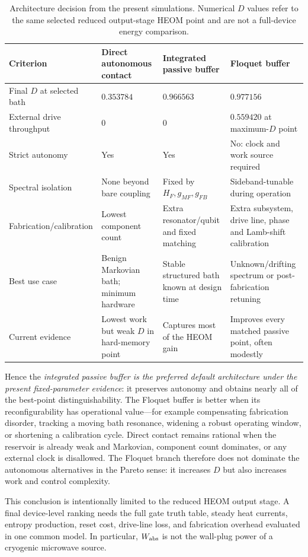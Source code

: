 \documentclass[11pt,a4paper]{article}
\theoremstyle{plain}
\theoremstyle{definition}
\theoremstyle{remark}
\begin{document}
\begin{table}[H]\centering\small
\caption{Architecture decision from the present simulations.  Numerical
$D$ values refer to the same selected reduced output-stage HEOM point and
are not a full-device energy comparison.}
\label{tab:architecture-decision}
\begin{tabularx}{\textwidth}{@{}l X X X@{}}
\toprule
Criterion & Direct autonomous contact & Integrated passive buffer & Floquet buffer \\
\midrule
Final $D$ at selected bath & $0.353784$ & $0.966563$ & $0.977156$ \\
External drive throughput & $0$ & $0$ & $0.559420$ at maximum-$D$ point \\
Strict autonomy & Yes & Yes & No: clock and work source required \\
Spectral isolation & None beyond bare coupling & Fixed by $H_F,g_{MF},g_{FB}$ & Sideband-tunable during operation \\
Fabrication/calibration & Lowest component count & Extra resonator/qubit and fixed matching & Extra subsystem, drive line, phase and Lamb-shift calibration \\
Best use case & Benign Markovian bath; minimum hardware & Stable structured bath known at design time & Unknown/drifting spectrum or post-fabrication retuning \\
Current evidence & Lowest work but weak $D$ in hard-memory point & Captures most of the HEOM gain & Improves every matched passive point, often modestly \\
\bottomrule
\end{tabularx}
\end{table}

Hence the \emph{integrated passive buffer is the preferred default
architecture under the present fixed-parameter evidence}: it preserves
autonomy and obtains nearly all of the best-point distinguishability.
The Floquet buffer is better when its reconfigurability has operational
value---for example compensating fabrication disorder, tracking a moving
bath resonance, widening a robust operating window, or shortening a
calibration cycle.  Direct contact remains rational when the reservoir is
already weak and Markovian, component count dominates, or any external
clock is disallowed.  The Floquet branch therefore does not dominate the
autonomous alternatives in the Pareto sense: it increases $D$ but also
increases work and control complexity.

This conclusion is intentionally limited to the reduced HEOM output
stage.  A final device-level ranking needs the full gate truth table,
steady heat currents, entropy production, reset cost, drive-line loss,
and fabrication overhead evaluated in one common model.  In particular,
$W_{\rm abs}$ is not the wall-plug power of a cryogenic microwave source.
\end{document}
